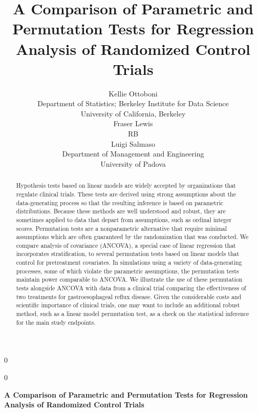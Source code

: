 \documentclass[12pt]{article}
\newcommand{\blind}{0}
\begin{document}
%

\def\spacingset#1{\renewcommand{\baselinestretch}%
{#1}\small\normalsize} \spacingset{1}



\blind
{
  \title{\bf A Comparison of Parametric and Permutation Tests for Regression Analysis of Randomized Control Trials}
\author{Kellie Ottoboni \\
Department of Statistics; Berkeley Institute for Data Science\\
University of California, Berkeley \\ 
Fraser Lewis \\
RB\\ 
Luigi Salmaso\\
Department of Management and Engineering \\
University of Padova
}  \maketitle
} \fi

\blind
{
  \bigskip
  \bigskip
  \bigskip
  \begin{center}
    {\LARGE\bf  A Comparison of Parametric and Permutation Tests for Regression Analysis of Randomized Control Trials}
\end{center}
  \medskip
} \fi

\bigskip
\begin{abstract}
Hypothesis tests based on linear models are widely accepted by organizations that regulate clinical trials.
These tests are derived using strong assumptions about the data-generating process so that the resulting inference is based on parametric distributions.
Because these methods are well understood and robust, they are sometimes applied to data that depart from assumptions, such as ordinal integer scores.
Permutation tests are a nonparametric alternative that require minimal assumptions which are often guaranteed by the randomization that was conducted.
We compare analysis of covariance (ANCOVA), a special case of linear regression that incorporates stratification, to several permutation tests based on linear models that control for pretreatment covariates.
In simulations using a variety of data-generating processes, some of which violate the parametric assumptions,
the permutation tests maintain power comparable to ANCOVA.
We illustrate the use of these permutation tests alongside ANCOVA with data from a clinical trial comparing the effectiveness of two treatments for gastroesophageal reflux disease.
Given the considerable costs and scientific importance of clinical trials, one may want to include an additional robust method, such as a linear model permutation test, as a check on the statistical inference for the main study endpoints.
\end{abstract}
\end{document}
